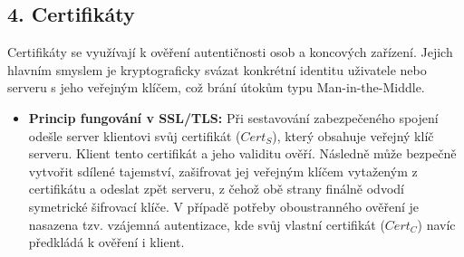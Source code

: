                 \subsection*{4. Certifikáty}
                    Certifikáty se využívají k ověření autentičnosti osob a koncových zařízení. Jejich hlavním smyslem je kryptograficky svázat konkrétní identitu uživatele nebo serveru s jeho veřejným klíčem, což brání útokům typu Man-in-the-Middle.
                    
                    \begin{itemize}
                        \item \textbf{Princip fungování v SSL/TLS:} Při sestavování zabezpečeného spojení odešle server klientovi svůj certifikát ($Cert_S$), který obsahuje veřejný klíč serveru. Klient tento certifikát a jeho validitu ověří. Následně může bezpečně vytvořit sdílené tajemství, zašifrovat jej veřejným klíčem vytaženým z certifikátu a odeslat zpět serveru, z čehož obě strany finálně odvodí symetrické šifrovací klíče. V případě potřeby oboustranného ověření je nasazena tzv. vzájemná autentizace, kde svůj vlastní certifikát ($Cert_C$) navíc předkládá k ověření i klient.
                    \end{itemize}
\newpage